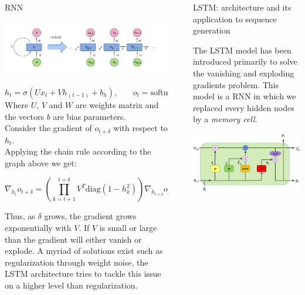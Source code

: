 \documentclass[final]{beamer}
\newlength{\sepwidth}
\newlength{\colwidth}
\newcommand{\separatorcolumn}{\begin{column}{\sepwidth}\end{column}}
\begin{document}
\begin{frame}[t]
\begin{columns}[t]
\begin{column}{\colwidth}
\begin{block}{RNN} 
\begin{center}
    \includegraphics[width = 0.9\linewidth]{RNN.png}
\end{center}
\begin{equation*}
    h_t = \sigma(U x_t + V h_{(t-1)} + b_h)\text{,}
    \qquad o_t = \text{softmax}(W h_t + b_o)
\end{equation*}
\small{Where $ U$, $V$ and $W$ are weights matrix and the vectors $b$ are bias
parameters.}\\

\normalsize
Consider the gradient of $o_{t + \delta}$ with respect to $h_t$.\\
Applying the chain rule according to the graph above we get:

\begin{equation*}
  \nabla_{h_t} o_{t + \delta} = \left( \prod_{k = t+1}^{t+\delta} V^T
  \text{diag}(1 - h^2_k) \right)\nabla_{h_{t + \delta}}o_{t + \delta}.
\end{equation*}

Thus, as $\delta$ grows, the gradient grows exponentially with $V$. If $V$ is
small or large than the gradient will either vanish or explode. A myriad
of solutions exist such as regularization through weight noise, the LSTM
architecture tries to tackle this issue on a higher level than regularization.
\end{block}
\end{column}
\separatorcolumn

\begin{column}{\colwidth}

\begin{block}{LSTM: architecture and its application to sequence generation}

The LSTM model has been introduced primarily to solve the vanishing and
exploding gradients problem. This model is a RNN in which we replaced every
hidden nodes by a \textit{memory cell}.  \begin{center}
    \includegraphics[width = 0.7\linewidth]{lstm.png}
\end{center}


\end{block}
\end{column}
\end{columns}
\end{frame}
\end{document}
